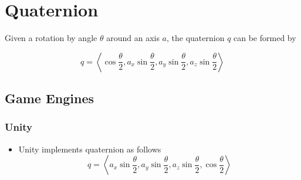 \chapter{Quaternion}

Given a rotation by angle $ \theta $ around an axis $ a $, the quaternion $ q $
can be formed by

\begin{equation}
  q =
  \left<
    \cos\frac{\theta}{2},
    a_{x} \sin\frac{\theta}{2},
    a_{y} \sin\frac{\theta}{2},
    a_{z} \sin\frac{\theta}{2}
  \right>
\end{equation}

\section{Game Engines}

  \subsection{Unity}

    \begin{itemize}
      \item Unity implements quaternion as follows
      \begin{equation}
        q =
        \left<
          a_{x} \sin\frac{\theta}{2},
          a_{y} \sin\frac{\theta}{2},
          a_{z} \sin\frac{\theta}{2},
          \cos\frac{\theta}{2}
        \right>
      \end{equation}
    \end{itemize}
